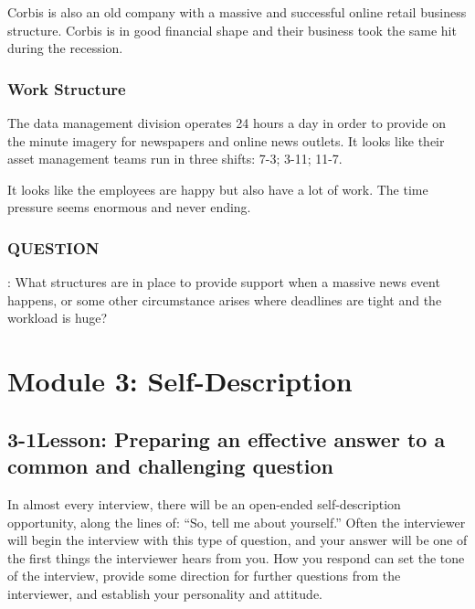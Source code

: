 Corbis is also an old company with a massive and successful online retail business structure. Corbis is in good financial shape and their business took the same hit during the recession.

\subsubsection*{Work Structure}

The data management division operates 24 hours a day in order to provide on the minute imagery for newspapers and online news outlets. It looks like their asset management teams run in three shifts: 7-3; 3-11; 11-7.

It looks like the employees are happy but also have a lot of work. The time pressure seems enormous and never ending.

\subsubsection*{QUESTION}: What structures are in place to provide support when a massive news event happens, or some other circumstance arises where deadlines are tight and the workload is huge?


\pagebreak \section*{Module 3:	Self-Description}
\noindent\makebox[\textwidth]{\rule{\linewidth}{0.4pt}}  \localtableofcontents
\noindent\makebox[\textwidth]{\rule{\linewidth}{0.4pt}}


\pagebreak \subsection*{3-1\quad Lesson: Preparing an effective answer to a common and challenging question}
In almost every interview, there will be an open-ended self-description opportunity, along the lines of: ``So, tell me about yourself.'' Often the interviewer will begin the interview with this type of question, and your answer will be one of the first things the interviewer hears from you. How you respond can set the tone of the interview, provide some direction for further questions from the interviewer, and establish your personality and attitude.

